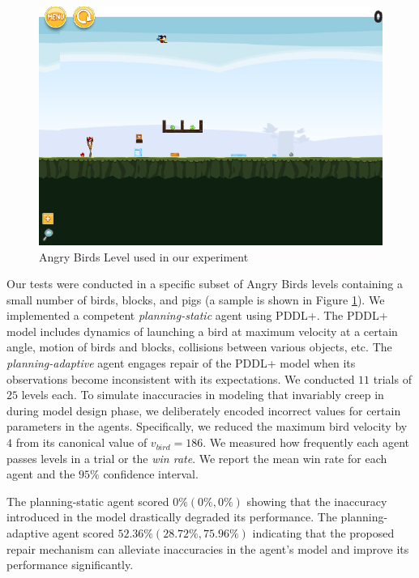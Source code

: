 \documentclass[letterpaper]{article} %
\begin{document}
\begin{figure}
    \centering
    \includegraphics[width=0.9\columnwidth]{figures/sb_level.png}
    \caption{Angry Birds Level used in our experiment}
    \label{fig:ab_level}
\end{figure}


Our tests were conducted in a specific subset of Angry Birds levels containing a small number of birds, blocks, and pigs (a sample is shown in Figure \ref{fig:ab_level}). We implemented a competent \emph{planning-static} agent using PDDL+. The PDDL+ model includes dynamics of launching a bird at maximum velocity at a certain angle, motion of birds and blocks, collisions between various objects, etc. The \emph{planning-adaptive} agent engages repair of the PDDL+ model when its observations become inconsistent with its expectations. We conducted $11$ trials of $25$ levels each. To simulate inaccuracies in modeling that invariably creep in during model design phase, we deliberately encoded incorrect values for certain parameters in the agents. Specifically, we reduced the maximum bird velocity by $4$ from its canonical value of $v_{bird}=186$. We measured how frequently each agent passes levels in a trial or the \emph{win rate}.
We report the mean win rate for each agent and the $95\%$ confidence interval.

The planning-static agent scored $0\% (0\%, 0\%)$ showing that the inaccuracy introduced in the model drastically degraded its performance. The planning-adaptive agent scored $52.36\% (28.72\%, 75.96\%)$ indicating that the proposed repair mechanism can alleviate inaccuracies in the agent's model and improve its performance significantly.
\end{document}
